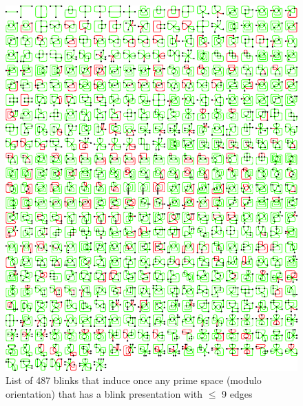 \begin{figure}[h!tp]
   \begin{center}
      \leavevmode
      \includegraphics[width=15cm]{A.figs/primespace487representants.eps}
   \end{center}
   \vspace{-0.7cm}
   \caption{ List of 487 blinks that induce once any prime space (modulo orientation)
   that has a blink presentation with $\leq$ 9 edges}
   \label{fig:primeSpace487Representatives}
\end{figure}

\newpage

